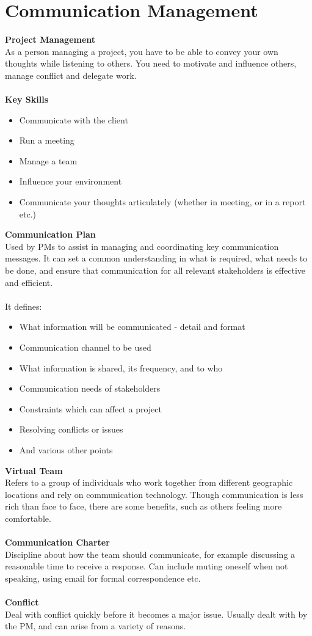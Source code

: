 \documentclass[a4paper,10pt]{article}
\begin{document}
\section*{Communication Management}
\textcolor{BlueGreen}{\textbf{Project Management}} \\
As a person managing a project, you have to be able to convey your own thoughts while listening to others. You need to motivate and influence others, manage conflict and delegate work. \\\\
\textcolor{BlueGreen}{\textbf{Key Skills}}
\begin{itemize}
	\item Communicate with the client 
	\item Run a meeting 
	\item Manage a team 
	\item Influence your environment 
	\item Communicate your thoughts articulately (whether in meeting, or in a report etc.)
\end{itemize}
\textcolor{BlueGreen}{\textbf{Communication Plan}} \\
Used by PMs to assist in managing and coordinating key communication messages. It can set a common understanding in what is required, what needs to be done, and ensure that communication for all relevant stakeholders is effective and efficient. \\\\
It defines: 
\begin{itemize}
	\item What information will be communicated - detail and format 
	\item Communication channel to be used 
	\item What information is shared, its frequency, and to who 
	\item Communication needs of stakeholders 
	\item Constraints which can affect a project  
	\item Resolving conflicts or issues 
	\item And various other points \\
\end{itemize}
\textcolor{BlueGreen}{\textbf{Virtual Team}} \\
Refers to a group of individuals who work together from different geographic locations and rely on communication technology. Though communication is less rich than face to face, there are some benefits, such as others feeling more comfortable. \\\\
\textcolor{BlueGreen}{\textbf{Communication Charter}} \\
Discipline about how the team should communicate, for example discussing a reasonable time to receive a response. Can include muting oneself when not speaking, using email for formal correspondence etc. \\\\
\textcolor{BlueGreen}{\textbf{Conflict}} \\
Deal with conflict quickly before it becomes a major issue. Usually dealt with by the PM, and can arise from a variety of reasons.
\newpage
\end{document}
